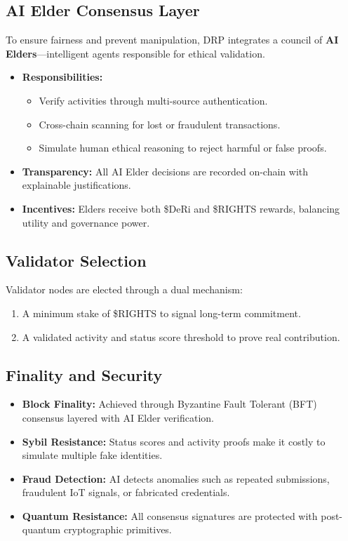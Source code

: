\documentclass[11pt,a4paper]{article}
\begin{document}
\subsection{AI Elder Consensus Layer}
To ensure fairness and prevent manipulation, DRP integrates a council of \textbf{AI Elders}—intelligent agents responsible for ethical validation.  
\begin{itemize}
    \item \textbf{Responsibilities:}  
        \begin{itemize}
            \item Verify activities through multi-source authentication.  
            \item Cross-chain scanning for lost or fraudulent transactions.  
            \item Simulate human ethical reasoning to reject harmful or false proofs.  
        \end{itemize}
    \item \textbf{Transparency:} All AI Elder decisions are recorded on-chain with explainable justifications.  
    \item \textbf{Incentives:} Elders receive both \$DeRi and \$RIGHTS rewards, balancing utility and governance power.  
\end{itemize}

\subsection{Validator Selection}
Validator nodes are elected through a dual mechanism:  
\begin{enumerate}
    \item A minimum stake of \$RIGHTS to signal long-term commitment.  
    \item A validated activity and status score threshold to prove real contribution.  
\end{enumerate}

\subsection{Finality and Security}
\begin{itemize}
    \item \textbf{Block Finality:} Achieved through Byzantine Fault Tolerant (BFT) consensus layered with AI Elder verification.  
    \item \textbf{Sybil Resistance:} Status scores and activity proofs make it costly to simulate multiple fake identities.  
    \item \textbf{Fraud Detection:} AI detects anomalies such as repeated submissions, fraudulent IoT signals, or fabricated credentials.  
    \item \textbf{Quantum Resistance:} All consensus signatures are protected with post-quantum cryptographic primitives.  
\end{itemize}
\end{document}
